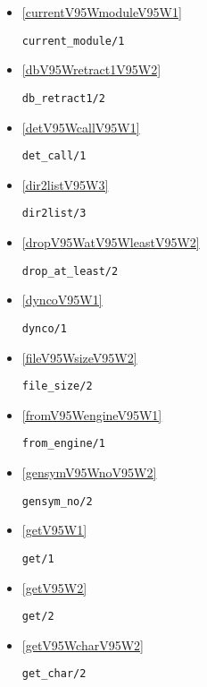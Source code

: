 \begin{itemize}
\item \ref{currentV95WmoduleV95W1} 
\begin{verbatim}
current_module/1
\end{verbatim}

\item \ref{dbV95Wretract1V95W2} 
\begin{verbatim}
db_retract1/2
\end{verbatim}

\item \ref{detV95WcallV95W1} 
\begin{verbatim}
det_call/1
\end{verbatim}

\item \ref{dir2listV95W3} 
\begin{verbatim}
dir2list/3
\end{verbatim}

\item \ref{dropV95WatV95WleastV95W2} 
\begin{verbatim}
drop_at_least/2
\end{verbatim}

\item \ref{dyncoV95W1} 
\begin{verbatim}
dynco/1
\end{verbatim}

\item \ref{fileV95WsizeV95W2} 
\begin{verbatim}
file_size/2
\end{verbatim}

\item \ref{fromV95WengineV95W1} 
\begin{verbatim}
from_engine/1
\end{verbatim}

\item \ref{gensymV95WnoV95W2} 
\begin{verbatim}
gensym_no/2
\end{verbatim}

\item \ref{getV95W1} 
\begin{verbatim}
get/1
\end{verbatim}

\item \ref{getV95W2} 
\begin{verbatim}
get/2
\end{verbatim}

\item \ref{getV95WcharV95W2} 
\begin{verbatim}
get_char/2
\end{verbatim}


\end{itemize}
